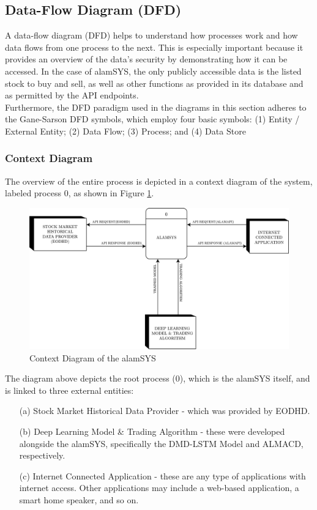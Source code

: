 \subsection{Data-Flow Diagram (DFD)}
\label{subsec:dfd}
A data-flow diagram (DFD) helps to understand how processes work and how data flows 
from one process to the next. This is especially important because it provides an 
overview of the data's security by demonstrating how it can be accessed. 
In the case of alamSYS, the only publicly accessible data is the listed stock to buy and sell, 
as well as other functions as provided in its database and as permitted by the API endpoints.
\hfill \\

Furthermore, the DFD paradigm used in the diagrams in this section adheres to 
the Gane-Sarson DFD symbols, which employ four basic symbols: 
(1) Entity / External Entity; 
(2) Data Flow; 
(3) Process; and 
(4) Data Store 
\cite{VisualParadigm}


\subsubsection{Context Diagram}
\label{subsubsec:context_dfd}
The overview of the entire process is depicted in a context diagram of the system, 
labeled process 0, as shown in Figure
\ref{fig:context_dfd}.
\begin{figure}[ht]
    \centering
    \includegraphics[width=1\textwidth]{./assets/Chapter_3/DFD/DFD_Context.png}
    \caption{Context Diagram of the alamSYS}
    \label{fig:context_dfd}
\end{figure}
\FloatBarrier
\vspace{0.5cm}
The diagram above depicts the root process (0), which is the alamSYS itself, 
and is linked to three external entities: 
\begin{itemize}
    \item[(a)] Stock Market Historical Data Provider - 
    which was provided by EODHD.
    \item[(b)] Deep Learning Model \& Trading Algorithm - these were 
    developed alongside the alamSYS, specifically the DMD-LSTM Model and ALMACD, respectively.
    \item[(c)] Internet Connected Application - these are any type of applications with internet access. 
    Other applications may include a web-based application, a smart home speaker, and so on.
\end{itemize}
\hfill

